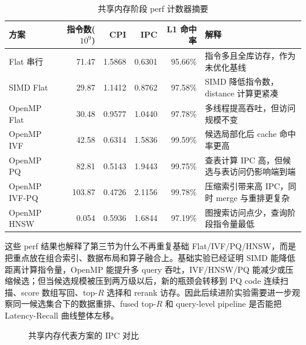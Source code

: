 \documentclass[a4paper]{article}
\begin{document}
\begin{table}[H]
\centering
\scriptsize
\caption{共享内存阶段 perf 计数器摘要}
\label{tab:perf-counter}
\begin{tabularx}{\textwidth}{lrrrrX}
\toprule
方案 & 指令数($10^9$) & CPI & IPC & L1 命中率 & 解释 \\
\midrule
Flat 串行 & 71.47 & 1.5868 & 0.6301 & 95.66\% & 指令多且全库访存，作为未优化基线 \\
SIMD Flat & 29.87 & 1.1412 & 0.8762 & 97.58\% & SIMD 降低指令数，distance 计算更紧凑 \\
OpenMP Flat & 30.48 & 0.9577 & 1.0440 & 97.78\% & 多线程提高吞吐，但访问规模不变 \\
OpenMP IVF & 42.58 & 0.6314 & 1.5836 & 99.59\% & 候选局部化后 cache 命中率更高 \\
OpenMP PQ & 82.81 & 0.5143 & 1.9443 & 99.75\% & 查表计算 IPC 高，但候选与表访问仍影响端到端 \\
OpenMP IVF-PQ & 103.87 & 0.4726 & 2.1156 & 99.78\% & 压缩索引带来高 IPC，同时 merge 与重排更复杂 \\
OpenMP HNSW & 0.054 & 0.5936 & 1.6844 & 97.19\% & 图搜索访问点少，查询阶段指令量最低 \\
\bottomrule
\end{tabularx}
\end{table}

这些 perf 结果也解释了第三节为什么不再重复基础 Flat/IVF/PQ/HNSW，而是把重点放在组合索引、数据布局和算子融合上。基础实验已经证明 SIMD 能降低距离计算指令量，OpenMP 能提升多 query 吞吐，IVF/HNSW/PQ 能减少或压缩候选；但当候选规模被压到两万级以后，新的瓶颈会转移到 PQ code 连续扫描、score 数组写回、top-$R$ 选择和 rerank 访存。因此后续进阶实验需要进一步观察同一候选集合下的数据重排、fused top-$R$ 和 query-level pipeline 是否能把 Latency-Recall 曲线整体左移。

\begin{figure}[H]
\centering
{}
\caption{共享内存代表方案的 IPC 对比}
\label{fig:ipc-compare}
\end{figure}
\end{document}
